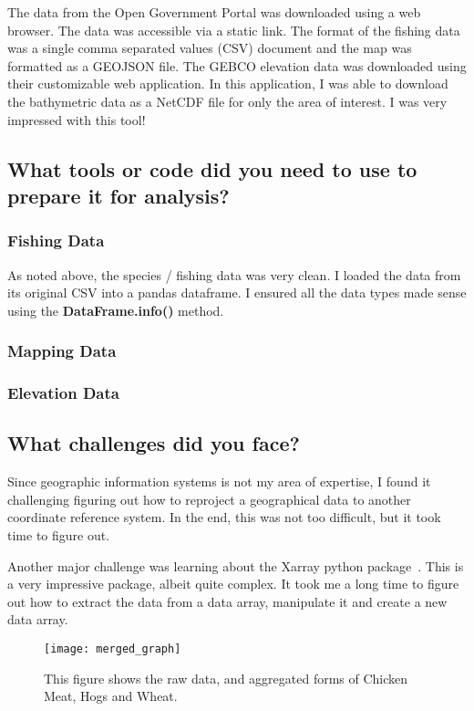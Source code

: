The data from the Open Government Portal was downloaded using a web browser.
The data was accessible via a static link.
The format of the fishing data was a single comma separated values (CSV) document and the map was formatted as a GEOJSON file.
The GEBCO elevation data was downloaded using their customizable web application.
In this application, I was able to download the bathymetric data as a NetCDF file for only the area of interest.
I was very impressed with this tool!


\subsection{What tools or code did you need to use to prepare it for analysis?}


\subsubsection{Fishing Data}

As noted above, the species / fishing data was very clean.
I loaded the data from its original CSV into a pandas dataframe.
I ensured all the data types made sense using the \textbf{DataFrame.info()} method.

\subsubsection{Mapping Data}



\subsubsection{Elevation Data}



\subsection{What challenges did you face?}

Since geographic information systems is not my area of expertise, I found it challenging figuring out how to reproject a geographical data to another
coordinate reference system.
In the end, this was not too difficult, but it took time to figure out.

Another major challenge was learning about the Xarray python package~\cite{xarray}.
This is a very impressive package, albeit quite complex.
It took me a long time to figure out how to extract the data from a data array, manipulate it and create a new data array.





\begin{figure}
    \texttt{[image: merged\_graph]}
    \caption{This figure shows the raw data, and aggregated forms of Chicken Meat, Hogs and Wheat.}
    \label{fig:chicken_prices}
\end{figure}

